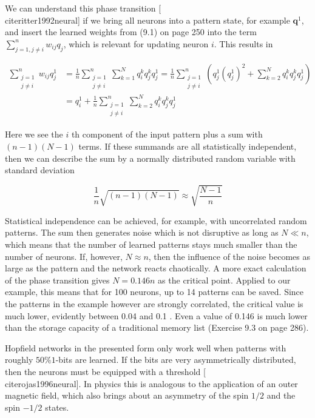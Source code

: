 \documentclass[10pt]{book}
\begin{document}
We can understand this phase transition [\\cite{ritter1992neural}] if we bring all neurons into a pattern state, for example $\boldsymbol{q}^{1}$, and insert the learned weights from (9.1) on page 250 into the term $\sum_{j=1, j \neq i}^{n} w_{i j} q_{j}$, which is relevant for updating neuron $i$. This results in

$$
\begin{aligned}
\sum_{\substack{j=1 \\
j \neq i}}^{n} w_{i j} q_{j}^{1} & =\frac{1}{n} \sum_{\substack{j=1 \\
j \neq i}}^{n} \sum_{k=1}^{N} q_{i}^{k} q_{j}^{k} q_{j}^{1}=\frac{1}{n} \sum_{\substack{j=1 \\
j \neq i}}^{n}\left(q_{j}^{1}\left(q_{j}^{1}\right)^{2}+\sum_{k=2}^{N} q_{i}^{k} q_{j}^{k} q_{j}^{1}\right) \\
& =q_{i}^{1}+\frac{1}{n} \sum_{\substack{j=1 \\
j \neq i}}^{n} \sum_{k=2}^{N} q_{i}^{k} q_{j}^{k} q_{j}^{1}
\end{aligned}
$$

Here we see the $i$ th component of the input pattern plus a sum with $(n-1)(N-1)$ terms. If these summands are all statistically independent, then we can describe the sum by a normally distributed random variable with standard deviation


$$
\frac{1}{n} \sqrt{(n-1)(N-1)} \approx \sqrt{\frac{N-1}{n}}
$$

Statistical independence can be achieved, for example, with uncorrelated random patterns. The sum then generates noise which is not disruptive as long as $N \ll n$, which means that the number of learned patterns stays much smaller than the number of neurons. If, however, $N \approx n$, then the influence of the noise becomes as large as the pattern and the network reacts chaotically. A more exact calculation of the phase transition gives $N=0.146 n$ as the critical point. Applied to our example, this means that for 100 neurons, up to 14 patterns can be saved. Since the patterns in the example however are strongly correlated, the critical value is much lower, evidently between 0.04 and 0.1 . Even a value of 0.146 is much lower than the storage capacity of a traditional memory list (Exercise 9.3 on page 286).

Hopfield networks in the presented form only work well when patterns with roughly $50 \% 1$-bits are learned. If the bits are very asymmetrically distributed, then the neurons must be equipped with a threshold [\\cite{rojas1996neural}]. In physics this is analogous to the application of an outer magnetic field, which also brings about an asymmetry of the spin $1 / 2$ and the spin $-1 / 2$ states.
\end{document}
